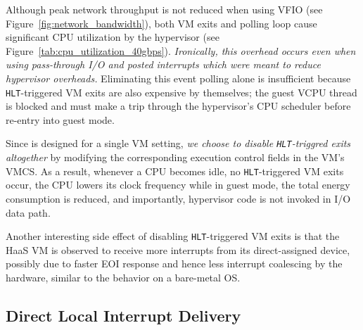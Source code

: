 Although peak network throughput is not reduced when 
using VFIO (see Figure~\ref{fig:network_bandwidth}), 
both VM exits and polling loop cause significant 
CPU utilization by the hypervisor 
(see Figure~\ref{tab:cpu_utilization_40gbps}).
{\em Ironically, this overhead occurs even when using pass-through I/O and 
posted interrupts which were meant to reduce hypervisor overheads.}
Eliminating this event polling alone is insufficient because {\tt HLT}-triggered VM exits 
are also expensive by themselves; the guest VCPU thread is blocked and
must make a trip through the hypervisor's CPU scheduler before 
re-entry into guest mode.

Since \na is designed for a single VM setting, {\em we choose to
disable {\tt HLT}-triggred exits altogether}
by modifying the corresponding execution control fields in the VM's VMCS.
As a result, whenever a CPU becomes idle, no {\tt HLT}-triggered
VM exits occur, the CPU lowers its clock frequency while in guest mode, 
the total energy consumption is reduced, and importantly, 
hypervisor code is not invoked in I/O data path. 

Another interesting side effect of disabling {\tt HLT}-triggered VM exits
is that the HaaS VM is observed to receive more interrupts
from its direct-assigned device, possibly due to 
faster EOI response and hence less interrupt coalescing by 
the hardware, similar to the behavior on a bare-metal OS.

%
%


\subsection{Direct Local Interrupt Delivery} 
\label{subsubsec:shared_pid_dtid}


